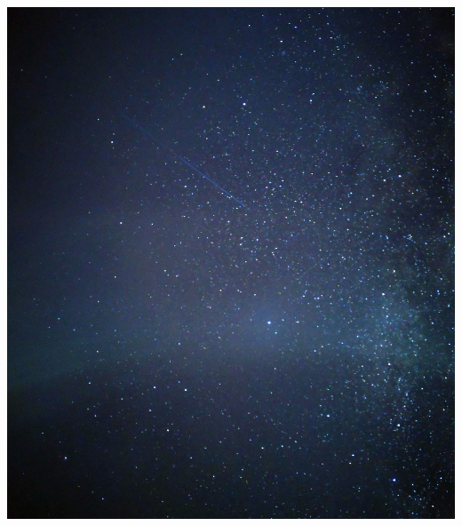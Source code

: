 \begin{frame}
{\begin{minipage}{\fourpicsize}
			\includegraphics[width=\textwidth]{../pics/IMG_20240823_205116}			
		\end{minipage}
		\vfill
		}
\end{frame}